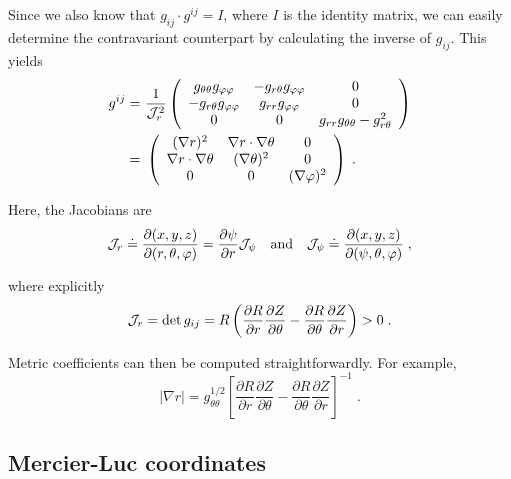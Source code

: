 \noindent
Since we also know that $g_{ij} \cdot g^{ij} = I$, where $I$ is the 
identity matrix, we can easily determine the contravariant counterpart 
by calculating the inverse of $g_{ij}$.  This yields
%
\begin{align}
g^{ij} = &~\frac{1}{{\mathcal J}_r^2} \left(
\begin{array}{ccc}
g_{\theta\theta}g_{\varphi\varphi} & -g_{r\theta}g_{\varphi\varphi} & 0 \\
-g_{r\theta}g_{\varphi\varphi} & g_{rr}g_{\varphi\varphi} & 0 \\
0      & 0      & g_{rr}g_{\theta\theta}-g_{r\theta}^2
\end{array} \right) \\
\quad = &~\left(
\begin{array}{ccc}
(\nabla r)^2 & \nabla r \cdot \nabla\theta & 0 \\
 \nabla r \cdot \nabla\theta &(\nabla\theta)^2  & 0 \\
0      & 0      & (\nabla\varphi)^2
\end{array}\right) \; . 
\end{align}

\noindent
Here, the Jacobians are 
%
\begin{equation}
{\mathcal J}_r \doteq \frac{\partial(x,y,z)}{\partial(r,\theta,\varphi)} = 
\frac{\partial \psi}{\partial r} {\mathcal J}_\psi  
\quad\mbox{and}\quad
{\mathcal J}_\psi \doteq \frac{\partial(x,y,z)}{\partial(\psi,\theta,\varphi)}  \; ,
\end{equation}

\noindent
where explicitly 
%
\begin{equation}
{\mathcal J}_r = \det g_{ij} =
 R \left( 
 \frac{\partial R}{\partial r}\frac{\partial Z}{\partial\theta} - 
 \frac{\partial R}{\partial\theta}\frac{\partial Z}{\partial r}
\right) > 0 \; .
\label{eq.jac}
\end{equation}

\noindent
Metric coefficients can then be computed straightforwardly.
For example,
%
\begin{equation}
\left| \nabla r \right| = g_{\theta\theta}^{1/2}
\left[
\frac{\partial R}{\partial r}\frac{\partial Z}{\partial\theta}-
\frac{\partial R}{\partial\theta}\frac{\partial Z}{\partial r}
\right]^{-1} \; .
\end{equation}

\subsection{Mercier-Luc coordinates}

